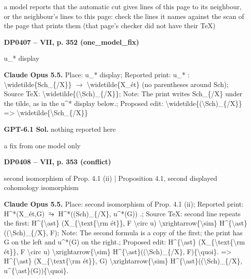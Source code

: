 a model reports that the automatic cut gives lines of this page to its neighbour, or the neighbour's lines to this page: check the lines it names against the scan of the page that prints them (that page's checker did not have their TeX)\par
\par\noindent\hypertarget{DP0407}{}\textbf{DP0407 -- VII, p. 352 (one\_model\_fix)}\par
u\_* display\par
\textbf{Claude Opus 5.5.} Place: u\_* display; Reported print: u\_* : \textbackslash{}widetilde\{Sch\_\{/X\}\} \ensuremath{\to} \textbackslash{}widetilde\{X\_ét\} (no parentheses around Sch); Source TeX: \textbackslash{}widetilde\{(\textbackslash{}Sch)\_\{/X\}\}; Note: The print writes Sch\_\{/X\} under the tilde, as in the u\textasciicircum{}* display below.; Proposed edit: \textbackslash{}widetilde\{(\textbackslash{}Sch)\_\{/X\}\} =\allowbreak > \textbackslash{}widetilde\{\textbackslash{}Sch\_\{/X\}\}\par
\textbf{GPT-6.1 Sol.} nothing reported here\par
a fix from one model only\par
\par\noindent\hypertarget{DP0408}{}\textbf{DP0408 -- VII, p. 353 (conflict)}\par
second isomorphism of Prop. 4.1 (ii) | Proposition 4.1, second displayed cohomology isomorphism\par
\textbf{Claude Opus 5.5.} Place: second isomorphism of Prop. 4.1 (ii); Reported print: H\textasciicircum{}*(X\_ét,G) \ensuremath{⥲} H\textasciicircum{}*((Sch)\_\{/X\}, u\textasciicircum{}*(G)) .; Source TeX: second line repeats the first: H\textasciicircum{}\{\textbackslash{}ast\} (X\_\{\textbackslash{}text\{\textbackslash{}rm ét\}\}, F \textbackslash{}circ u) \textbackslash{}xrightarrow\{\textbackslash{}sim\} H\textasciicircum{}\{\textbackslash{}ast\}((\textbackslash{}Sch)\_\{/X\}, F); Note: The second formula is a copy of the first; the print has G on the left and u\textasciicircum{}*(G) on the right.; Proposed edit: H\textasciicircum{}\{\textbackslash{}ast\} (X\_\{\textbackslash{}text\{\textbackslash{}rm ét\}\}, F \textbackslash{}circ u) \textbackslash{}xrightarrow\{\textbackslash{}sim\} H\textasciicircum{}\{\textbackslash{}ast\}((\textbackslash{}Sch)\_\{/X\}, F)\{\textbackslash{}quoi\}. =\allowbreak > H\textasciicircum{}\{\textbackslash{}ast\} (X\_\{\textbackslash{}text\{\textbackslash{}rm ét\}\}, G) \textbackslash{}xrightarrow\{\textbackslash{}sim\} H\textasciicircum{}\{\textbackslash{}ast\}((\textbackslash{}Sch)\_\{/X\}, u\textasciicircum{}\{\textbackslash{}ast\}(G))\{\textbackslash{}quoi\}.\par

